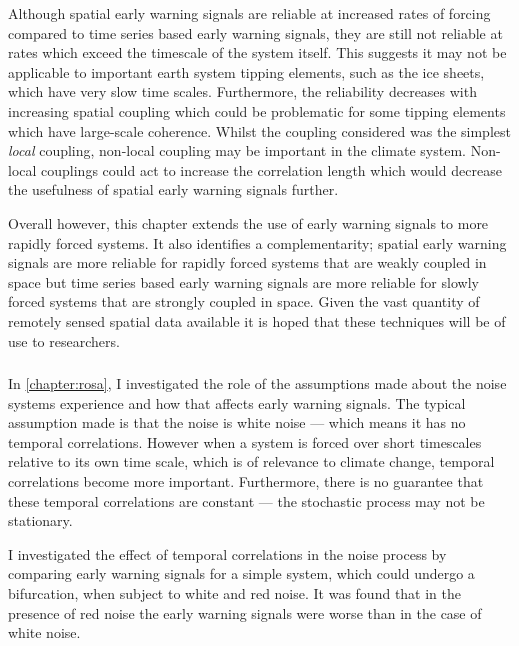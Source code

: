 Although spatial early warning signals are reliable at increased rates of forcing compared to time series based early warning signals, they are still not reliable at rates which exceed
the timescale of the system itself. This suggests it may not be applicable to important earth system tipping elements, such as the ice sheets, which have very slow time scales. Furthermore, the reliability decreases with
increasing spatial coupling which could be problematic for some tipping elements which have large-scale coherence. Whilst the coupling considered was the simplest \emph{local} coupling, non-local
coupling may be important in the climate system. Non-local couplings could act to increase the correlation length which would decrease the usefulness of spatial early warning signals further.

Overall however, this chapter extends the use of early warning signals to more rapidly forced systems. It also identifies a complementarity; spatial early warning signals are more reliable
for rapidly forced systems that are weakly coupled in space but time series based early warning signals are more reliable for slowly forced systems that are strongly coupled in space.
Given the vast quantity of remotely sensed spatial data available \parencite{Campbell2011} it is hoped that these techniques will be of use to researchers.

\subsubsection{}

In \cref{chapter:rosa}, I investigated the role of the assumptions made about the noise systems experience and how that affects early warning signals.
The typical assumption made is that the noise is white noise --- which means it has no temporal correlations. However when a system is forced over short timescales relative
to its own time scale, which is of relevance to climate change, temporal correlations become more important. Furthermore, there is no guarantee that these temporal
correlations are constant --- the stochastic process may not be stationary.

I investigated the effect of temporal correlations in the noise process by comparing early warning signals for a simple system, which could undergo a bifurcation, when subject to
white and red noise. It was found that in the presence of red noise the early warning signals were worse than in the case of white noise.

